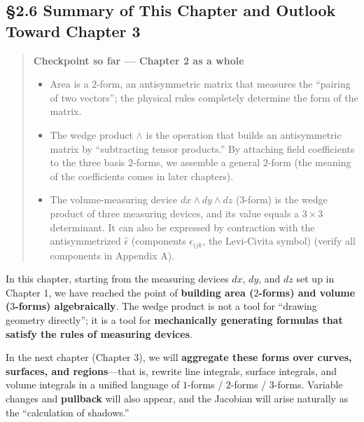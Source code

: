 \documentclass[a4paper,12pt,openany]{book}
\begin{document}
\par\vspace{0.35em}\par

\hypertarget{summary-of-this-chapter-and-outlook-toward-chapter-3}{%
\subsection{§2.6 Summary of This Chapter and Outlook Toward Chapter
3}\label{summary-of-this-chapter-and-outlook-toward-chapter-3}}

\begin{quote}
\textbf{Checkpoint so far — Chapter 2 as a whole}

\begin{itemize}
\item
  Area is a \(2\)-form, an antisymmetric matrix that measures the
  ``pairing of two vectors''; the physical rules completely determine
  the form of the matrix.
\item
  The wedge product \(\wedge\) is the operation that builds an
  antisymmetric matrix by ``subtracting tensor products.'' By attaching
  field coefficients to the three basis \(2\)-forms, we assemble a
  general \(2\)-form (the meaning of the coefficients comes in later
  chapters).
\item
  The volume-measuring device \(dx \wedge dy \wedge dz\) (\(3\)-form) is
  the wedge product of three measuring devices, and its value equals a
  \(3 \times 3\) determinant. It can also be expressed by contraction
  with the antisymmetrized \(\widehat{\epsilon}\) (components
  \(\epsilon_{ijk}\), the Levi-Civita symbol) (verify all components in
  Appendix A).
\end{itemize}
\end{quote}

In this chapter, starting from the measuring devices \(dx\), \(dy\), and
\(dz\) set up in Chapter 1, we have reached the point of
\textbf{building area (\(2\)-forms) and volume (\(3\)-forms)
algebraically}. The wedge product is not a tool for ``drawing geometry
directly''; it is a tool for
\textbf{mechanically generating formulas that satisfy the rules of measuring devices}.

In the next chapter (Chapter 3), we will
\textbf{aggregate these forms over curves, surfaces, and regions}—that
is, rewrite line integrals, surface integrals, and volume integrals in a
unified language of \(1\)-forms / \(2\)-forms / \(3\)-forms. Variable
changes and \textbf{pullback} will also appear, and the Jacobian will
arise naturally as the ``calculation of shadows.''
\end{document}
